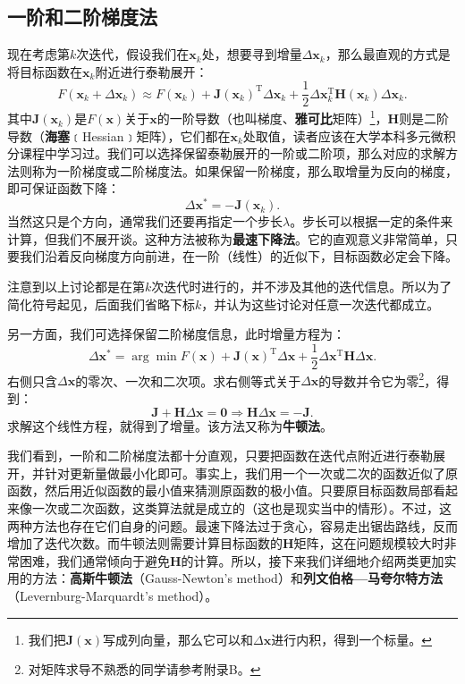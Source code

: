 \subsection{一阶和二阶梯度法}
现在考虑第$k$次迭代，假设我们在$\bm{x}_k$处，想要寻到增量$\Delta \bm{x}_k$，那么最直观的方式是将目标函数在$\bm{x}_k$附近进行泰勒展开：
\begin{equation}
F(\bm{x}_k+\Delta \bm{x}_k) \approx F{\left( \bm{x}_k \right)} + \bm{J} \left( \bm{x}_k \right) ^\mathrm{T} \Delta \bm{x}_k + \frac{1}{2}\Delta {\bm{x}_k^\mathrm{T}}\bm{H}(\bm{x}_k) \Delta \bm{x}_k.
\end{equation}
其中$\bm{J}(\bm{x}_k)$是$F(\bm{x})$关于$\bm{x}$的一阶导数（也叫梯度、\textbf{雅可比}矩阵）\footnote{我们把$\bm{J}(\bm{x})$写成列向量，那么它可以和$\Delta \bm{x}$进行内积，得到一个标量。}，$\bm{H}$则是二阶导数（\textbf{海塞}﹝Hessian﹞矩阵），它们都在$\bm{x}_k$处取值，读者应该在大学本科多元微积分课程中学习过。我们可以选择保留泰勒展开的一阶或二阶项，那么对应的求解方法则称为一阶梯度或二阶梯度法。如果保留一阶梯度，那么取增量为反向的梯度，即可保证函数下降：
\begin{equation}
\Delta \bm{x}^* = - \bm{J}(\bm{x}_k).
\end{equation}
当然这只是个方向，通常我们还要再指定一个步长$\lambda$。步长可以根据一定的条件来计算\textsuperscript{\cite{Wolfe1969}}，但我们不展开谈。这种方法被称为\textbf{最速下降法}。它的直观意义非常简单，只要我们沿着反向梯度方向前进，在一阶（线性）的近似下，目标函数必定会下降。

注意到以上讨论都是在第$k$次迭代时进行的，并不涉及其他的迭代信息。所以为了简化符号起见，后面我们省略下标$k$，并认为这些讨论对任意一次迭代都成立。

另一方面，我们可选择保留二阶梯度信息，此时增量方程为：
\begin{equation}
\Delta \bm{x}^* = \arg \min F\left( \bm{x} \right) + \bm{J} \left( \bm{x} \right)^\mathrm{T} \Delta \bm{x} + \frac{1}{2}\Delta {\bm{x}^\mathrm{T}}\bm{H} \Delta \bm{x}.
\end{equation}
右侧只含$\Delta \bm{x}$的零次、一次和二次项。求右侧等式关于$\Delta \bm{x}$的导数并令它为零\footnote{对矩阵求导不熟悉的同学请参考附录B。}，得到：
\begin{equation}
\bm{J} + \bm{H} \Delta \bm{x} = \bm{0} \Rightarrow
\bm{H} \Delta \bm{x} = -\bm{J}.
\end{equation}
求解这个线性方程，就得到了增量。该方法又称为\textbf{牛顿法}。

我们看到，一阶和二阶梯度法都十分直观，只要把函数在迭代点附近进行泰勒展开，并针对更新量做最小化即可。事实上，我们用一个一次或二次的函数近似了原函数，然后用近似函数的最小值来猜测原函数的极小值。只要原目标函数局部看起来像一次或二次函数，这类算法就是成立的（这也是现实当中的情形）。不过，这两种方法也存在它们自身的问题。最速下降法过于贪心，容易走出锯齿路线，反而增加了迭代次数。而牛顿法则需要计算目标函数的$\bm{H}$矩阵，这在问题规模较大时非常困难，我们通常倾向于避免$\bm{H}$的计算。所以，接下来我们详细地介绍两类更加实用的方法：\textbf{高斯牛顿法}（Gauss-Newton's method）和\textbf{列文伯格—马夸尔特方法}（Levernburg-Marquardt's method）。


